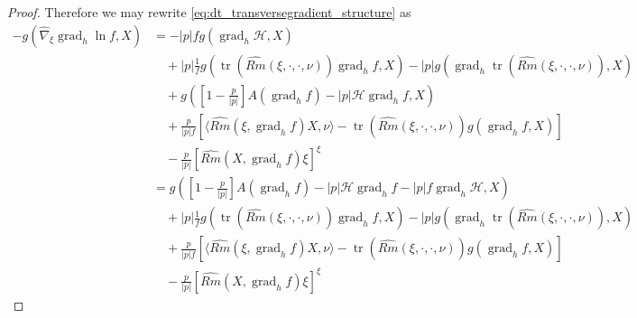 \documentclass{amsart}
\theoremstyle{definition}
\theoremstyle{remark}
\numberwithin{equation}{section}
\begin{document}
\begin{proof}
Therefore we may rewrite \eqref{eq:dt_transversegradient_structure} as
\begin{equation}
\label{eq:dt_transversegradient_structure2}
\begin{split}
-g(\hat{\nabla}_{\xi} \operatorname{grad}_h \ln f, X) &= -|p| fg(\operatorname{grad}_h \mathcal{H}, X) \\
&\quad + |p|\frac{1}{f} g(\operatorname{tr} \left(\widehat{Rm}(\xi, \cdot, \cdot, \nu)\right)\operatorname{grad}_h f, X) - |p| g(\operatorname{grad}_h \operatorname{tr} \left(\widehat{Rm}(\xi, \cdot, \cdot, \nu)\right), X) \\
&\quad + g\left(\left[1 -\frac{p}{|p|}\right] A(\operatorname{grad}_h f) -
|p|\mathcal{H} \operatorname{grad}_h f, X\right) \\
&\quad + \frac{p}{|p|f} \left[\langle \widehat{Rm}(\xi,\operatorname{grad}_h f)X,\nu\rangle -
\operatorname{tr} (\widehat{Rm}(\xi,\cdot,\cdot,\nu))g(\operatorname{grad}_h f, X)\right] \\
&\quad  -\frac{p}{|p|} \left[\widehat{Rm}(X, \operatorname{grad}_h f)\xi\right]^{\xi} \\
&= g\left(\left[1 -\frac{p}{|p|}\right] A(\operatorname{grad}_h f) -
|p|\mathcal{H} \operatorname{grad}_h f -|p| f \operatorname{grad}_h \mathcal{H}, X\right) \\
&\quad + |p|\frac{1}{f} g(\operatorname{tr} \left(\widehat{Rm}(\xi, \cdot, \cdot, \nu)\right)\operatorname{grad}_h f, X) - |p| g(\operatorname{grad}_h \operatorname{tr} \left(\widehat{Rm}(\xi, \cdot, \cdot, \nu)\right), X) \\
&\quad + \frac{p}{|p|f} \left[\langle \widehat{Rm}(\xi,\operatorname{grad}_h f)X,\nu\rangle -
\operatorname{tr} (\widehat{Rm}(\xi,\cdot,\cdot,\nu))g(\operatorname{grad}_h f, X)\right] \\
&\quad  -\frac{p}{|p|} \left[\widehat{Rm}(X, \operatorname{grad}_h f)\xi\right]^{\xi}
\end{split}
\end{equation}


\end{proof}
\end{document}
